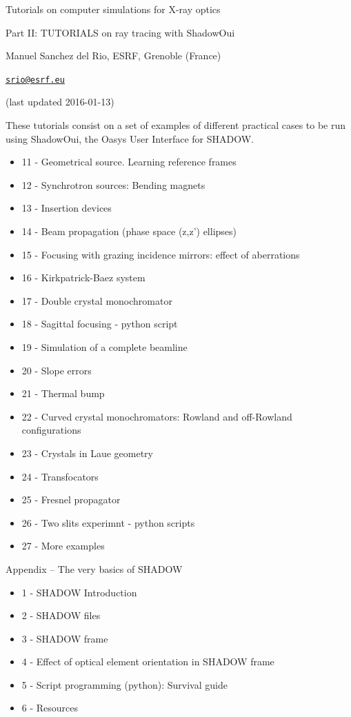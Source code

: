 \documentclass[]{article}
\date{}
\providecommand{\tightlist}{%
  \setlength{\itemsep}{0pt}\setlength{\parskip}{0pt}}
\begin{document}
Tutorials on computer simulations for X-ray optics

Part II: TUTORIALS on ray tracing with ShadowOui

Manuel Sanchez del Rio, ESRF, Grenoble (France)

\href{mailto:srio@esrf.eu}{\nolinkurl{srio@esrf.eu}}

(last updated 2016-01-13)

These tutorials consist on a set of examples of different practical
cases to be run using ShadowOui, the Oasys User Interface for SHADOW.

\begin{itemize}
\tightlist
\item
  11 - Geometrical source. Learning reference frames
\item
  12 - Synchrotron sources: Bending magnets
\item
  13 - Insertion devices
\item
  14 - Beam propagation (phase space (z,z') ellipses)
\item
  15 - Focusing with grazing incidence mirrors: effect of aberrations
\item
  16 - Kirkpatrick-Baez system
\item
  17 - Double crystal monochromator
\item
  18 - Sagittal focusing - python script
\item
  19 - Simulation of a complete beamline
\end{itemize}

\begin{itemize}
\tightlist
\item
  20 - Slope errors
\item
  21 - Thermal bump
\item
  22 - Curved crystal monochromators: Rowland and off-Rowland
  configurations
\item
  23 - Crystals in Laue geometry
\item
  24 - Transfocators
\item
  25 - Fresnel propagator
\item
  26 - Two slits experimnt - python scripts
\item
  27 - More examples
\end{itemize}

Appendix -- The very basics of SHADOW

\begin{itemize}
\tightlist
\item
  1 - SHADOW Introduction
\item
  2 - SHADOW files
\item
  3 - SHADOW frame
\item
  4 - Effect of optical element orientation in SHADOW frame
\item
  5 - Script programming (python): Survival guide
\item
  6 - Resources
\end{itemize}
\end{document}
